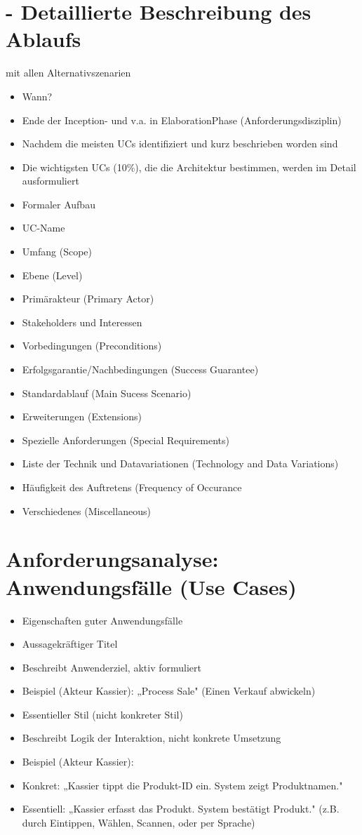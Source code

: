 \documentclass[10pt]{article}
\begin{document}
\section*{- Detaillierte Beschreibung des Ablaufs}
 mit allen Alternativszenarien\begin{itemize}
  \item Wann?
  \item Ende der Inception- und v.a. in ElaborationPhase (Anforderungsdisziplin)
  \item Nachdem die meisten UCs identifiziert und kurz beschrieben worden sind
  \item Die wichtigsten UCs (10\%), die die Architektur bestimmen, werden im Detail ausformuliert
  \item Formaler Aufbau
  \item UC-Name
  \item Umfang (Scope)
  \item Ebene (Level)
  \item Primärakteur (Primary Actor)
  \item Stakeholders und Interessen
  \item Vorbedingungen (Preconditions)
  \item Erfolgsgarantie/Nachbedingungen (Success Guarantee)
  \item Standardablauf (Main Sucess Scenario)
  \item Erweiterungen (Extensions)
  \item Spezielle Anforderungen (Special Requirements)
  \item Liste der Technik und Datavariationen (Technology and Data Variations)
  \item Häufigkeit des Auftretens (Frequency of Occurance
  \item Verschiedenes (Miscellaneous)
\end{itemize}

\section*{Anforderungsanalyse: Anwendungsfälle (Use Cases)}
\begin{itemize}
  \item Eigenschaften guter Anwendungsfälle
  \item Aussagekräftiger Titel
  \item Beschreibt Anwenderziel, aktiv formuliert
  \item Beispiel (Akteur Kassier): „Process Sale" (Einen Verkauf abwickeln)
  \item Essentieller Stil (nicht konkreter Stil)
  \item Beschreibt Logik der Interaktion, nicht konkrete Umsetzung
  \item Beispiel (Akteur Kassier):
  \item Konkret: „Kassier tippt die Produkt-ID ein. System zeigt Produktnamen."
  \item Essentiell: „Kassier erfasst das Produkt. System bestätigt Produkt." (z.B. durch Eintippen, Wählen, Scannen, oder per Sprache)
\end{itemize}
\end{document}
